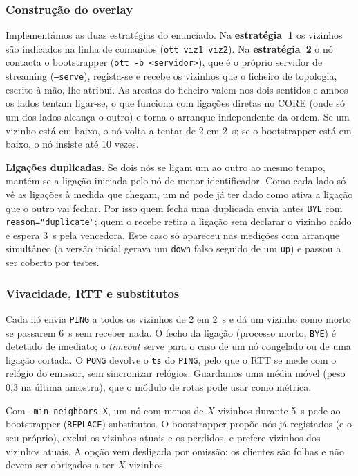 \subsubsection{Construção do overlay}

Implementámos as duas estratégias do enunciado. Na \textbf{estratégia~1} os vizinhos são indicados na
linha de comandos (\texttt{ott viz1 viz2}). Na \textbf{estratégia~2} o nó contacta o bootstrapper
(\texttt{ott -b <servidor>}), que é o próprio servidor de streaming (\texttt{--serve}), regista-se e
recebe os vizinhos que o ficheiro de topologia, escrito à mão, lhe atribui. As arestas do ficheiro
valem nos dois sentidos e ambos os lados tentam ligar-se, o que funciona com ligações diretas no CORE
(onde só um dos lados alcança o outro) e torna o arranque independente da ordem. Se um vizinho está em
baixo, o nó volta a tentar de 2 em 2~s; se o bootstrapper está em baixo, o nó insiste até 10 vezes.

\textbf{Ligações duplicadas.} Se dois nós se ligam um ao outro ao mesmo tempo, mantém-se a ligação
iniciada pelo nó de menor identificador. Como cada lado só vê as ligações à medida que chegam, um nó
pode já ter dado como ativa a ligação que o outro vai fechar. Por isso quem fecha uma duplicada envia
antes \texttt{BYE} com \texttt{reason="duplicate"}; quem o recebe retira a ligação sem declarar o
vizinho caído e espera 3~s pela vencedora. Este caso só apareceu nas medições com arranque simultâneo
(a versão inicial gerava um \texttt{down} falso seguido de um \texttt{up}) e passou a ser coberto por
testes.

\subsubsection{Vivacidade, RTT e substitutos}

Cada nó envia \texttt{PING} a todos os vizinhos de 2 em 2~s e dá um vizinho como morto se passarem
6~s sem receber nada. O fecho da ligação (processo morto, \texttt{BYE}) é detetado de imediato;
o \emph{timeout} serve para o caso de um nó congelado ou de uma ligação cortada. O \texttt{PONG}
devolve o \texttt{ts} do \texttt{PING}, pelo que o RTT se mede com o relógio do emissor, sem
sincronizar relógios. Guardamos uma média móvel (peso 0,3 na última amostra), que o módulo de rotas
pode usar como métrica.

Com \texttt{--min-neighbors X}, um nó com menos de $X$ vizinhos durante 5~s pede ao bootstrapper
(\texttt{REPLACE}) substitutos. O bootstrapper propõe nós já registados (e o seu próprio), exclui os
vizinhos atuais e os perdidos, e prefere vizinhos dos vizinhos atuais. A opção vem desligada por
omissão: os clientes são folhas e não devem ser obrigados a ter $X$ vizinhos.

